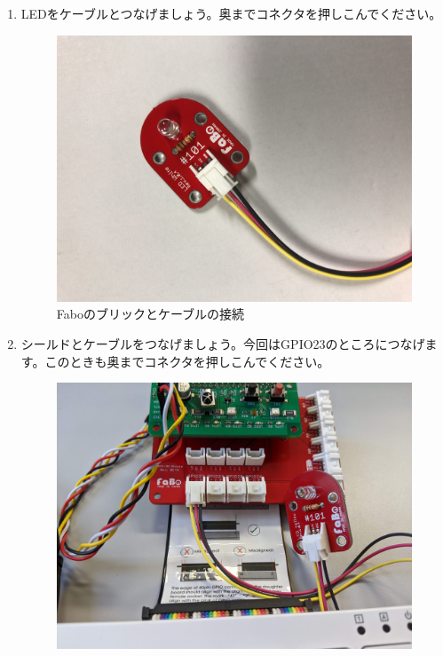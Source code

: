\begin{enumerate}
\begin{figure}[H]
\end{figure}
\item LEDをケーブルとつなげましょう。奥までコネクタを押しこんでください。\\
\begin{figure}[H]
 \centering
 \includegraphics[width=\hsize/2]{images/chap05/text05-img008.jpg}
 \caption{Faboのブリックとケーブルの接続}
\end{figure}
\item シールドとケーブルをつなげましょう。今回はGPIO23のところにつなげます。このときも奥までコネクタを押しこんでください。\\
\begin{figure}[H]
 \centering
 \includegraphics[width=\hsize/2]{images/chap05/led_brk_on_fabo_with_sb_zoomed.jpg}

\end{figure}
\end{enumerate}
